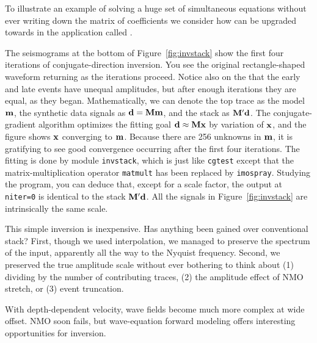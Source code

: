 To illustrate an example of solving a huge set of simultaneous
equations without ever writing down the matrix of coefficients
we consider how
{\it {}} can be upgraded towards
{\it {}} in the application called .
\par
The seismograms at the bottom of Figure~\ref{fig:invstack}
show the first four iterations of conjugate-direction inversion.
You see the original rectangle-shaped waveform returning
as the iterations proceed.
Notice also on the 
that the early and late events have unequal amplitudes,
but after enough iterations they are equal,
as they began.
Mathematically,
we can denote the top trace as the model $\bold m$,
the synthetic data signals as $\bold d = \bold M \bold m$,
and the stack as $\bold M' \bold d$.
The conjugate-gradient algorithm optimizes the fitting goal
$\bold d \approx \bold M \bold x$ by variation of $\bold x$,
and the figure shows $\bold x$ converging to $\bold m$.
Because there are 256 unknowns in $\bold m$,
it is gratifying to see good convergence occurring
after the first four iterations.
The fitting is done by module {\tt invstack},
which is just like
\texttt{cgtest}  except that the matrix-multiplication operator
\texttt{matmult}  has been replaced by
\texttt{imospray}. %
Studying the program,
you can deduce that,
except for a scale factor,
the output at {\tt niter=0} is identical to the stack $\bold M' \bold d$.
All the signals in Figure~\ref{fig:invstack} are intrinsically the same scale.%
\par
This simple inversion is inexpensive.
Has anything been gained over conventional stack?
First,
though we used  interpolation,
we managed to preserve the spectrum of the input,
apparently all the way to the Nyquist frequency.
Second, we preserved the true amplitude scale
without ever bothering to think about
(1) dividing by the number of contributing traces,
(2) the amplitude effect of NMO stretch, or
(3) event truncation.
\par
With depth-dependent velocity,
wave fields become much more complex at wide offset.
NMO soon fails,
but wave-equation forward modeling
offers interesting opportunities for inversion.

